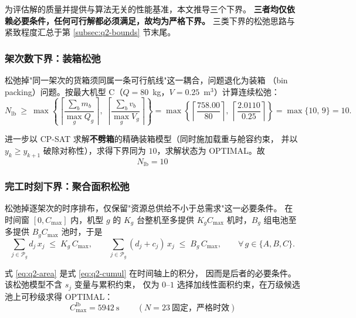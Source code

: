 为评估解的质量并提供与算法无关的性能基准，本文推导三个下界。
\textbf{三者均仅依赖必要条件，任何可行解都必须满足，故均为严格下界。}
三类下界的松弛思路与紧致程度汇总于第 \ref{subsec:q2-bounds} 节末尾。

\subsubsection{架次数下界：装箱松弛}

松弛掉"同一架次的货箱须同属一条可行航线"这一耦合，问题退化为装箱
（bin packing）问题。按最大机型 C（$Q=80$~kg，$V=0.25$~m$^3$）计算连续松弛：
\begin{equation}
  N_{\mathrm{lb}}\ \ge\
  \max\left\{
    \left\lceil \frac{\sum_b m_b}{\max_g Q_g}\right\rceil,\
    \left\lceil \frac{\sum_b v_b}{\max_g V_g}\right\rceil
  \right\}
  =\max\left\{
    \left\lceil \frac{758.00}{80}\right\rceil,\
    \left\lceil \frac{2.0110}{0.25}\right\rceil
  \right\}
  =\max\{10,\,9\}=10 .
\end{equation}

进一步以 CP-SAT 求解\textbf{不劈箱}的精确装箱模型（同时施加载重与舱容约束，
并以 $y_k\ge y_{k+1}$ 破除对称性），求得下界同为 $10$，求解状态为 OPTIMAL。故
\begin{equation}
  \boxed{\,N_{\mathrm{lb}}=10\,}
\end{equation}

\subsubsection{完工时刻下界：聚合面积松弛}

松弛掉逐架次的时序排布，仅保留"资源总供给不小于总需求"这一必要条件。
在时间窗 $[0,C_{\max}]$ 内，机型 $g$ 的 $K_g$ 台整机至多提供 $K_g C_{\max}$
机时，$B_g$ 组电池至多提供 $B_g C_{\max}$ 池时，于是
\begin{equation}
  \sum_{j\in\mathcal{P}_g} d_j\,x_j \;\le\; K_g\,C_{\max},
  \qquad
  \sum_{j\in\mathcal{P}_g} (d_j+c_j)\,x_j \;\le\; B_g\,C_{\max},
  \qquad \forall\,g\in\{A,B,C\} .
  \label{eq:q2-area}
\end{equation}

式 \eqref{eq:q2-area} 是式 \eqref{eq:q2-cumul} 在时间轴上的积分，
因而是后者的必要条件。该松弛模型不含 $s_j$ 变量与累积约束，
仅为 $0$--$1$ 选择加线性面积约束，在万级候选池上可秒级求得 OPTIMAL：
\begin{equation}
  \boxed{\,C_{\max}^{\mathrm{lb}}=5942~\mathrm{s}\,}
  \qquad (N=23\ \text{固定，严格时效})
\end{equation}

